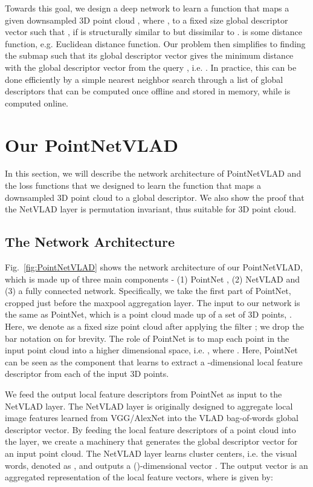 \documentclass[10pt,twocolumn,letterpaper]{article}
\begin{document}
Towards this goal, we design a deep network to learn a function  that maps a given downsampled 3D point cloud , where , to a fixed size global descriptor vector  such that , if  is structurally similar to  but dissimilar to .  is some distance function, e.g. Euclidean distance function. Our problem then simplifies to finding the submap  such that its global descriptor vector  gives the minimum distance with the global descriptor vector  from the query , i.e. . In practice, this can be done efficiently by a simple nearest neighbor search through a list of global descriptors  that can be computed once offline and stored in memory, while   is computed online. 



 	\section{Our PointNetVLAD}

In this section, we will describe the network architecture of PointNetVLAD and the loss functions that we designed to learn the function 
 that maps a downsampled 3D point cloud to a global descriptor. We also show the proof that the NetVLAD layer is permutation invariant, thus suitable for 3D point cloud. 
 
\subsection{The Network Architecture}

Fig.~\ref{fig:PointNetVLAD} shows the network architecture of our PointNetVLAD, which is made up of three main components - (1) PointNet \cite{qi2016pointnet}, (2) NetVLAD \cite{Arandjelovic16} and (3) a fully connected network. Specifically, we take the first part of PointNet, cropped just before the maxpool aggregation layer. The input to our network is the same as PointNet, which is a point cloud made up of a set of 3D points, . Here, we denote  as a fixed size point cloud after applying the filter ; we drop the bar notation on  for brevity.
The role of PointNet is to map each point in the input point cloud into a higher dimensional space, i.e. , where . Here, PointNet can be seen as the component that learns to extract a -dimensional local feature descriptor from each of the input 3D points.

We feed the output local feature descriptors from PointNet as input to the NetVLAD layer. The NetVLAD layer is originally designed to aggregate local image features learned from VGG/AlexNet into the VLAD bag-of-words global descriptor vector. By feeding the local feature descriptors of a point cloud into the layer, we create a machinery that generates the global descriptor vector for an input point cloud. The NetVLAD layer learns  cluster centers, i.e. the visual words, denoted as , and outputs a ()-dimensional vector . The output vector  is an aggregated representation of the local feature vectors, where  is given by:
\end{document}

